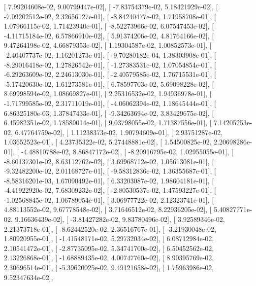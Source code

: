 \documentclass{article}
\begin{document}
       [  7.99204608e-02,   9.00799447e-02],
       [ -7.83754379e-02,   5.18421929e-02],
       [ -7.09202512e-02,   2.32656127e-01],
       [ -8.84240477e-02,   1.71958708e-01],
       [  1.07966115e-02,   1.71423940e-01],
       [ -8.52273966e-02,   6.07547453e-02],
       [ -4.11715184e-02,   6.57866910e-02],
       [  5.91374206e-02,   4.81764166e-02],
       [  9.47264198e-02,   4.66879353e-02],
       [  1.19304587e-02,   1.00852573e-01],
       [ -2.40407737e-02,   1.16201273e-01],
       [ -9.70280182e-04,   1.38303908e-01],
       [ -8.29016418e-02,   1.27826542e-01],
       [ -1.27383531e-02,   1.07054854e-01],
       [ -6.29263609e-02,   2.24613030e-01],
       [ -2.40579585e-02,   1.76715531e-01],
       [ -5.17420630e-02,   1.61273581e-01],
       [  6.78597703e-02,   5.69098228e-02],
       [  8.69998594e-02,   1.08669827e-01],
       [  2.25316532e-02,   1.94936978e-01],
       [ -1.71799585e-02,   2.31711019e-01],
       [ -4.06062394e-02,   1.18645444e-01],
       [  6.86325180e-03,   1.37847433e-01],
       [ -9.34263694e-02,   3.83429675e-02],
       [  6.45982351e-02,   1.78589014e-01],
       [  9.03798055e-02,   1.71387556e-01],
       [  7.14205253e-02,   6.47764759e-02],
       [  1.11238373e-02,   1.90794609e-01],
       [  2.93751287e-02,   1.03652523e-01],
       [  4.23735322e-02,   5.27448881e-02],
       [  1.54500825e-02,   2.20698286e-01],
       [ -4.48810788e-02,   8.86847172e-02],
       [ -8.20916795e-02,   1.02955055e-01],
       [ -8.60137301e-02,   8.63112762e-02],
       [  3.69968712e-02,   1.05613081e-01],
       [ -9.32482200e-02,   2.01168727e-01],
       [ -9.58312836e-02,   1.36355687e-01],
       [ -8.58316201e-03,   1.67090492e-01],
       [  6.33203087e-02,   1.98604181e-01],
       [ -4.41922920e-02,   7.68309232e-02],
       [ -2.80530537e-02,   1.47593227e-01],
       [ -1.02568845e-02,   1.06789054e-01],
       [  3.06977722e-02,   2.12323741e-01],
       [  4.88113552e-02,   9.67778548e-02],
       [  3.71646512e-02,   8.22936205e-02],
       [  5.40827771e-02,   9.16636439e-02],
       [ -3.81427282e-02,   9.83780496e-02],
       [  3.92589346e-02,   2.21373718e-01],
       [ -8.62442520e-02,   2.36516767e-01],
       [ -3.21930048e-02,   1.80920955e-01],
       [ -1.41548171e-02,   5.29732034e-02],
       [  6.08712984e-02,   2.10541472e-01],
       [ -2.87735095e-02,   5.34741700e-02],
       [  6.50452562e-02,   2.13226868e-01],
       [ -1.68889435e-02,   4.00747760e-02],
       [  8.90395769e-02,   2.30696514e-01],
       [ -5.39620025e-02,   9.49121658e-02],
       [  1.75963986e-02,   9.52347634e-02],
\end{document}

